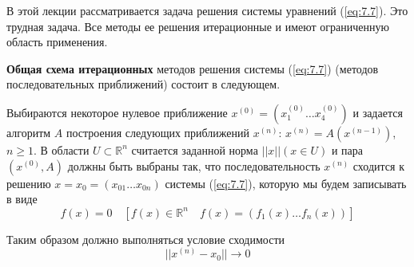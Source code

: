 В этой лекции рассматривается задача решения системы уравнений (\ref{eq:7.7}). Это трудная задача. Все методы ее решения итерационные и имеют ограниченную область применения. 

\textbf{Общая схема итерационных} методов решения системы (\ref{eq:7.7}) (методов последовательных приближений) состоит в следующем.

Выбираются некоторое нулевое приближение $x^{(0)} = (x_1^{(0)} \dots x_4^{(0)})$ и задается алгоритм $A$ построения следующих приближений $x^{(n)}$: $x^{(n)} = A(x^{(n-1)})$, $n \geq 1$. В области $U \subset \mathbb{R}^n$ считается заданной норма $||x|| (x \in U)$ и пара $(x^{(0)}, A)$ должны быть выбраны так, что последовательность $x^{(n)}$ сходится к решению $x = x_0 = (x_{01} \dots x_{0n})$ системы (\ref{eq:7.7}), которую мы будем записывать в виде
\begin{equation} \label{eq:representation}
	f(x) = 0 \quad [f(x) \in \mathbb{R}^n \quad f(x) = (f_1(x) \dots f_n(x))]
\end{equation}

Таким образом должно выполняться условие сходимости
\begin{equation} \label{eq:representation}
	||x^{(n)} - x_0|| \to 0
\end{equation}

